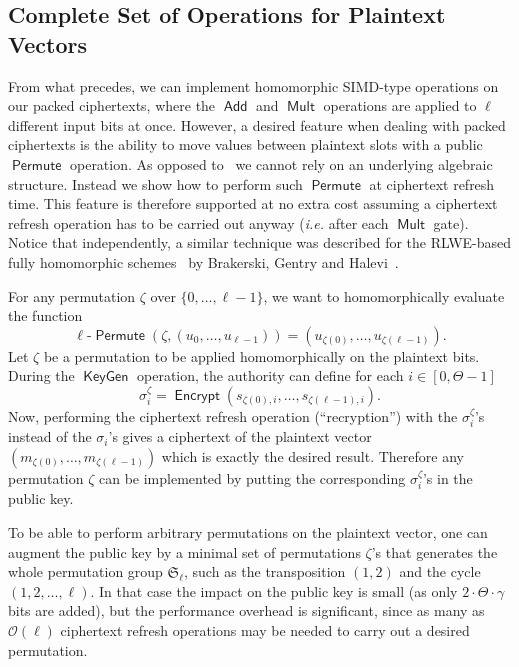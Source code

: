 \documentclass[11pt]{llncs}
\newcommand{\ie}{\textsl{i.e.}\xspace}
\DeclareMathOperator{\KeyGen}{\ensuremath{\mathsf{KeyGen}}}
\DeclareMathOperator{\Encrypt}{\ensuremath{\mathsf{Encrypt}}}
\DeclareMathOperator{\Add}{\ensuremath{\mathsf{Add}}}
\DeclareMathOperator{\Mult}{\ensuremath{\mathsf{Mult}}}
\DeclareMathOperator{\Permute}{\ensuremath{\mathsf{Permute}}}
\renewcommand*\O{\ensuremath{\mathcal O}}
\begin{document}
\subsection{Complete Set of Operations for Plaintext Vectors}\label{subsec:permutations}

From what precedes, we can implement homomorphic SIMD-type operations on
our packed ciphertexts, where the $\Add$ and $\Mult$ operations are
applied to $\ell$ different input bits at once. However, a desired
feature when dealing with packed ciphertexts is the ability to move
values between plaintext slots with a public $\Permute$ operation. As opposed to~\cite{GHS2012a} we cannot rely on an underlying algebraic structure.
Instead we show how to perform  such $\Permute$ at ciphertext refresh time.
This feature is therefore supported at no extra cost assuming a
ciphertext refresh operation has to be carried out anyway (\ie after each
$\Mult$ gate). Notice that independently, a similar technique was described 
for the RLWE-based fully homomorphic schemes~\cite{BV2011a,BV2011b,GHS2012a}
by Brakerski, Gentry and Halevi~\cite{BGH2013}.

\smallskip
For any permutation $\zeta$ over $\{0,\ldots,{\ell-1}\}$, we want to homomorphically evaluate the function
\[ \text{$\ell$-$\Permute$}\left(\zeta,\left(u_0,\ldots,u_{\ell-1}\right)\right) = \left(u_{\zeta(0)},\ldots,u_{\zeta({\ell-1})}\right). \]
Let $\zeta$ be a permutation to be applied  homomorphically on the plaintext bits. During the $\KeyGen$ operation, the authority can define for each $i\in[0,\Theta-1]$
\[ \sigma_{i}^{\zeta} = \Encrypt(s_{\zeta(0),i},\ldots,s_{\zeta(\ell-1),i}). \]
Now, performing the ciphertext refresh operation (``recryption'') with the $\sigma_i^\zeta$'s instead of the $\sigma_i$'s gives a ciphertext of the plaintext vector
$(m_{\zeta(0)},\ldots,m_{\zeta(\ell-1)})$
which is exactly the desired result. Therefore any permutation $\zeta$
can be implemented by putting the corresponding $\sigma^\zeta_i$'s in the public key.

To be able to perform arbitrary permutations on the plaintext vector, one
can augment the public key by a minimal set of permutations $\zeta$'s
that generates the whole permutation group $\mathfrak S_\ell$, such as
the transposition $(1,2)$ and the cycle $(1,2,\ldots,\ell)$. In that case
the impact on the public key is small (as only $2\cdot \Theta\cdot
\gamma$ bits are added), but the performance overhead is significant,
since as many as $\O(\ell)$ ciphertext refresh operations may be needed to
carry out a desired permutation.
\end{document}
